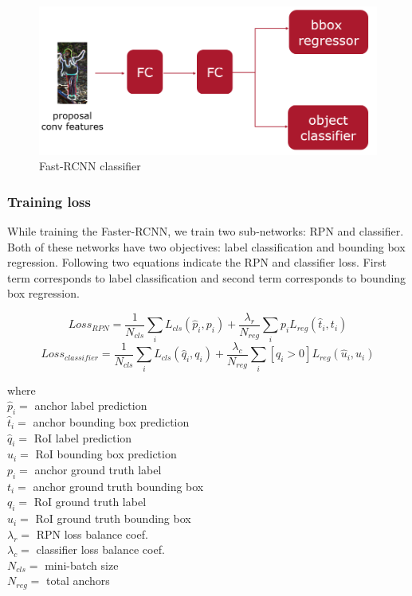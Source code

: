 \begin{figure}
    \centering
    \includegraphics[width=\linewidth]{images/classifier.PNG}
    \caption{Fast-RCNN classifier}
    \label{fig:classifier}
\end{figure}


\subsubsection{Training loss}
While training the Faster-RCNN, we train two sub-networks: RPN and classifier. Both of these networks have two objectives: label classification and bounding box regression. Following two equations indicate the RPN and classifier loss. First term corresponds to label classification and second term corresponds to bounding box regression. 

$$Loss_{RPN}= \frac{1}{N_{cls}}\sum_i L_{cls}(\hat{p}_i,p_i) + \frac{\lambda_r}{N_{reg}}\sum_i p_i L_{reg}(\hat{t}_i,t_i)$$
$$Loss_{classifier} = \frac{1}{N_{cls}}\sum_i L_{cls}(\hat{q}_i,q_i) + \frac{\lambda_c}{N_{reg}}\sum_i [q_i > 0] L_{reg}(\hat{u}_i,u_i)$$

where \\
$\hat{p}_i=$ anchor label prediction \\
$\hat{t}_i=$ anchor bounding box prediction \\
$\hat{q}_i=$ RoI label prediction \\
$\hat{u}_i=$ RoI bounding box prediction \\
${p}_i=$ anchor ground truth label \\
${t}_i=$ anchor ground truth bounding box  \\
${q}_i=$ RoI ground truth label  \\
${u}_i=$ RoI ground truth bounding box  \\
$\lambda_r =$ RPN loss balance coef. \\
$\lambda_c =$ classifier loss balance coef. \\
$N_{cls}=$ mini-batch size \\
$N_{reg}=$ total anchors

